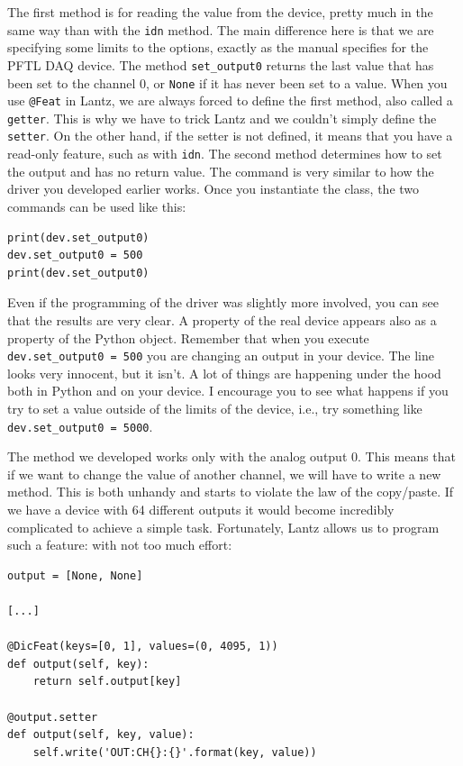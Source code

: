The first method is for reading the value from the device, pretty much in the same way than with the \texttt{idn} method. The main difference here is that we are specifying some limits to the options, exactly as the manual specifies for the {PFTL DAQ} device. The method \texttt{set\_output0} returns the last value that has been set to the channel 0, or \texttt{None} if it has never been set to a value. When you use \texttt{@Feat} in Lantz, we are always forced to define the first method, also called a \texttt{getter}. This is why we have to trick Lantz and we couldn't simply define the \texttt{setter}. On the other hand, if the setter is not defined, it means that you have a read-only feature, such as with \texttt{idn}. The second method determines how to set the output and has no return value. The command is very similar to how the driver you developed earlier works. Once you instantiate the class, the two commands can be used like this:

\begin{verbatim}
print(dev.set_output0)
dev.set_output0 = 500
print(dev.set_output0)
\end{verbatim}

Even if the programming of the driver was slightly more involved, you can see that the results are very clear. A property of the real device appears also as a property of the Python object. Remember that when you execute \texttt{dev.set\_output0 = 500} you are changing an output in your device. The line looks very innocent, but it isn't. A lot of things are happening under the hood both in Python and on your device. I encourage you to see what happens if you try to set a value outside of the limits of the device, i.e., try something like \texttt{dev.set\_output0 = 5000}.

The method we developed works only with the analog output 0. This means that if we want to change the value of another channel, we will have to write a new method. This is both unhandy and starts to violate the law of the copy/paste. If we have a device with 64 different outputs it would become incredibly complicated to achieve a simple task. Fortunately, Lantz allows us to program such a feature:
with not too much effort:

\begin{verbatim}
output = [None, None]

[...]

@DicFeat(keys=[0, 1], values=(0, 4095, 1))
def output(self, key):
    return self.output[key]

@output.setter
def output(self, key, value):
    self.write('OUT:CH{}:{}'.format(key, value))
\end{verbatim}

